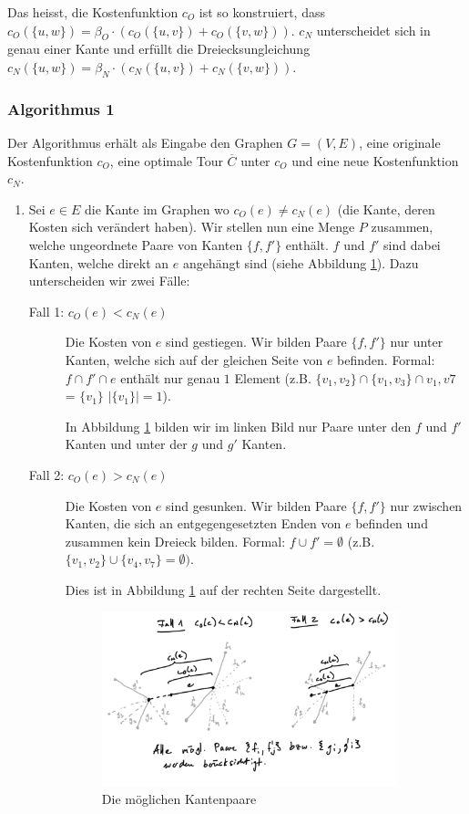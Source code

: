 \documentclass[a4paper,11pt]{scrreprt}
\begin{document}
Das heisst, die Kostenfunktion $c_O$ ist so konstruiert, dass $c_O(\{u,w\}) = \beta_O \cdot (c_O(\{u,v\}) + c_O(\{v,w\}))$. $c_N$ unterscheidet sich in genau einer Kante und erfüllt die Dreiecksungleichung $c_N(\{u,w\}) = \beta_N \cdot (c_N(\{u,v\}) + c_N(\{v,w\}))$.

\subsubsection{Algorithmus 1}

Der Algorithmus erhält als Eingabe den Graphen $G = (V,E)$, eine originale Kostenfunktion $c_O$, eine optimale Tour $\overline{C}$ unter $c_O$ und eine neue Kostenfunktion $c_N$.

\begin{enumerate}
\item Sei $e \in E$ die Kante im Graphen wo $c_O(e) \not= c_N(e)$ (die Kante, deren Kosten sich verändert haben). Wir stellen nun eine Menge $P$ zusammen, welche ungeordnete Paare von Kanten $\{f, f'\}$ enthält. $f$ und $f'$ sind dabei Kanten, welche direkt an $e$ angehängt sind (siehe Abbildung \ref{fig:lm-beta-approx1}). Dazu unterscheiden wir zwei Fälle:

\begin{description}
\item[Fall 1: $c_O(e) < c_N(e)$] Die Kosten von $e$ sind gestiegen. Wir bilden Paare $\{f, f'\}$ nur unter Kanten, welche sich auf der gleichen Seite von $e$ befinden. Formal: $f \cap f' \cap e$ enthält nur genau $1$ Element (z.B. $\{v_1, v_2\} \cap \{v_1, v_3\} \cap {v_1, v7}$ = $\{v_1\}$ $|\{v_1\}| = 1$).

In Abbildung \ref{fig:lm-beta-approx1} bilden wir im linken Bild nur Paare unter den $f$ und $f'$ Kanten und unter der $g$ und 
$g'$ Kanten.

\item[Fall 2: $c_O(e) > c_N(e)$] Die Kosten von $e$ sind gesunken. Wir bilden Paare $\{f, f'\}$ nur zwischen Kanten, die sich an entgegengesetzten Enden von $e$ befinden und zusammen kein Dreieck bilden. Formal: $f \cup f' = \emptyset$ (z.B. $\{v_1, v_2\} \cup \{v_4, v_7\} = \emptyset)$.

Dies ist in Abbildung \ref{fig:lm-beta-approx1} auf der rechten Seite dargestellt.

\begin{figure}[H]
\centering
\includegraphics[width=0.9\textwidth]{lm_beta_approx1.png}
\caption{Die möglichen Kantenpaare}
\label{fig:lm-beta-approx1}
\end{figure}


\end{description}
\end{enumerate}
\end{document}

